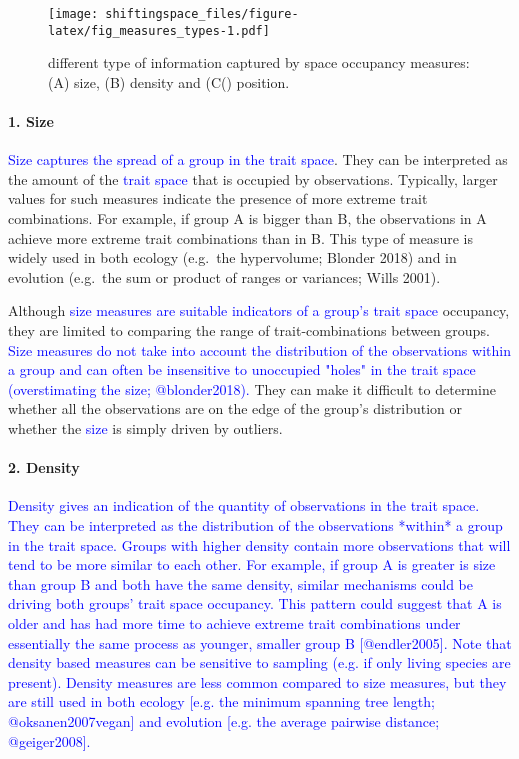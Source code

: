 \documentclass[]{article}
\let\oldparagraph\paragraph
\renewcommand{\paragraph}[1]{\oldparagraph{#1}\mbox{}}
\begin{document}
\begin{figure}
\centering
\texttt{[image: shiftingspace\_files/figure-latex/fig\_measures\_types-1.pdf]}
\caption{different type of information captured by space
occupancy measures: (A) size, (B) density and (C() position.}
\end{figure}

\renewcommand\baselinestretch{1.6}\selectfont

\paragraph{1. Size}\label{size}

\textcolor{blue}{Size captures the spread of a group in the trait space}.
They can be interpreted as the amount of the
\textcolor{blue}{trait space} that is occupied by
observations. Typically, larger values for such measures indicate the
presence of more extreme trait combinations. For example, if group A is
bigger than B, the observations in A achieve more extreme trait
combinations than in B. This type of measure is widely used in both
ecology (e.g.~the hypervolume; Blonder 2018) and in evolution (e.g.~the
sum or product of ranges or variances; Wills 2001).

Although
\textcolor{blue}{size measures are suitable indicators of a group's trait space}
occupancy, they are limited to comparing the range of trait-combinations
between groups.
\textcolor{blue}{Size measures do not take into account the distribution of the observations within a group and can often be insensitive to unoccupied "holes" in the trait space (overstimating the size; @blonder2018).}
They can make it difficult to determine whether all the observations are
on the edge of the group's distribution or whether the
\textcolor{blue}{size} is simply driven by outliers.

\paragraph{2. Density}\label{density}

\textcolor{blue}{Density gives an indication of the quantity of observations in the trait space.
They can be interpreted as the distribution of the observations *within* a group in the trait space.
Groups with higher density contain more observations that will tend to be more similar to each other.
For example, if group A is greater is size than group B and both have the same density, similar mechanisms could be driving both groups' trait space occupancy. 
This pattern could suggest that A is older and has had more time to achieve extreme trait combinations under essentially the same process as younger, smaller group B [@endler2005].
Note that density based measures can be sensitive to sampling (e.g. if only living species are present).
Density measures are less common compared to size measures, but they are still used in both ecology [e.g. the minimum spanning tree length; @oksanen2007vegan] and evolution [e.g. the average pairwise distance; @geiger2008]. }
\end{document}
